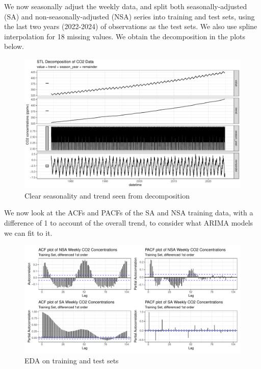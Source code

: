 \documentclass[
]{article}
\begin{document}
We now seasonally adjust the weekly data, and split both seasonally-adjusted (SA) and non-seasonally-adjusted (NSA) series into training and test sets, using the last two years (2022-2024) of observations as the test sets. We also use spline interpolation for 18 missing values. We obtain the decomposition in the plots below.

\begin{figure}

{\centering \includegraphics[width=1\linewidth]{lab_prompt_Updated_files/figure-latex/stl-decomposition-1} 

}

\caption{Clear seasonality and trend seen from decomposition}\label{fig:stl-decomposition}
\end{figure}

We now look at the ACFs and PACFs of the SA and NSA training data, with a difference of 1 to account of the overall trend, to consider what ARIMA models we can fit to it.

\newpage

\begin{figure}

{\centering \includegraphics[width=1\linewidth]{lab_prompt_Updated_files/figure-latex/acf-and-pacfs-1} 

}

\caption{EDA on training and test sets}\label{fig:acf-and-pacfs}
\end{figure}
\end{document}
